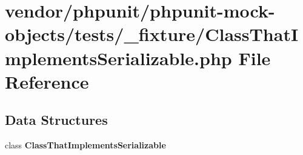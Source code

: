 \section{vendor/phpunit/phpunit-\/mock-\/objects/tests/\+\_\+fixture/\+Class\+That\+Implements\+Serializable.php File Reference}
\label{_class_that_implements_serializable_8php}
\subsection*{Data Structures}
\begin{DoxyCompactItemize}
\item 
class {\bf Class\+That\+Implements\+Serializable}
\end{DoxyCompactItemize}
